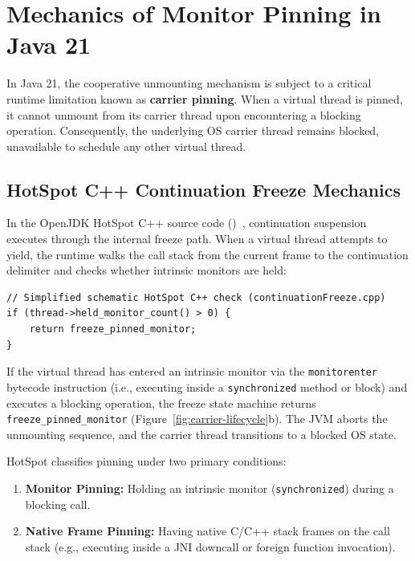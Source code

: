 \section{Mechanics of Monitor Pinning in Java 21}
\label{sec:monitor-pinning-mechanics}

In Java 21, the cooperative unmounting mechanism is subject to a critical runtime limitation known as \textbf{carrier pinning}. When a virtual thread is pinned, it cannot unmount from its carrier thread upon encountering a blocking operation. Consequently, the underlying OS carrier thread remains blocked, unavailable to schedule any other virtual thread.

\subsection{HotSpot C++ Continuation Freeze Mechanics}
In the OpenJDK HotSpot C++ source code ()~\cite{HotSpotSource}, continuation suspension executes through the internal freeze path. When a virtual thread attempts to yield, the runtime walks the call stack from the current frame to the continuation delimiter and checks whether intrinsic monitors are held:

\begin{verbatim}
// Simplified schematic HotSpot C++ check (continuationFreeze.cpp)
if (thread->held_monitor_count() > 0) {
    return freeze_pinned_monitor;
}
\end{verbatim}

If the virtual thread has entered an intrinsic monitor via the \texttt{monitorenter} bytecode instruction (i.e., executing inside a \texttt{synchronized} method or block) and executes a blocking operation, the freeze state machine returns \texttt{freeze\_pinned\_monitor} (Figure~\ref{fig:carrier-lifecycle}b). The JVM aborts the unmounting sequence, and the carrier thread transitions to a blocked OS state.

HotSpot classifies pinning under two primary conditions:
\begin{enumerate}
  \item \textbf{Monitor Pinning:} Holding an intrinsic monitor (\texttt{synchronized}) during a blocking call.
  \item \textbf{Native Frame Pinning:} Having native C/C++ stack frames on the call stack (e.g., executing inside a JNI downcall or foreign function invocation).
\end{enumerate}

